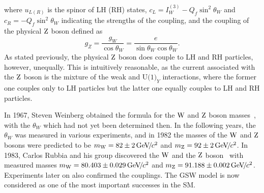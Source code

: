 where $u_{L(R)}$ is the spinor of LH (RH) states, $c_{L}=I_{W}^{(3)}-Q_{f}\sin^{2}\theta_{W}$ and $c_{R}=-Q_{f}\sin^{2}\theta_{W}$ indicating the strengths of the coupling, and the coupling of the physical $\mathrm{Z}$ boson defined as
\begin{equation}
\label{eqn:couplingZ}
g_{Z}=\frac{g_{W}}{\cos\theta_{W}}=\frac{e}{\sin\theta_{W}\cos\theta_{W}}.
\end{equation}
As stated previously, the physical $\mathrm{Z}$ boson does couple to LH and RH particles, however, unequally. This is intuitively reasonable, as the current associated with the $\mathrm{Z}$ boson is the mixture of the weak and $\text{U(1)}_{Y}$ interactions, where the former one couples only to LH particles but the latter one equally couples to LH and RH particles.

In 1967, Steven Weinberg obtained the formula for the $\mathrm{W}$ and $\mathrm{Z}$ boson masses~\cite{PhysRevLett.19.1264}, with the $\theta_{W}$ which had not yet been determined then. In the following years, the $\theta_{W}$ was measured in various experiments, and in 1982 the masses of the $\mathrm{W}$ and $\mathrm{Z}$ bosons were predicted to be $m_{\mathrm{W}}=82\pm 2{\,\text{Ge\hspace{-.08em}V\hspace{-0.16em}/\hspace{-0.08em}}c^\text{2}}$ and $m_{\mathrm{Z}}=92\pm 2 {\,\text{Ge\hspace{-.08em}V\hspace{-0.16em}/\hspace{-0.08em}}c^\text{2}}$. In 1983, Carlos Rubbia and his group discovered the $\mathrm{W}$ and the $\mathrm{Z}$ boson~\cite{ARNISON1983103,ARNISON1984241} with measured masses $m_{\mathrm{W}}=80.403\pm 0.029{\,\text{Ge\hspace{-.08em}V\hspace{-0.16em}/\hspace{-0.08em}}c^\text{2}}$ and $m_{\mathrm{Z}}=91.188\pm 0.002{\,\text{Ge\hspace{-.08em}V\hspace{-0.16em}/\hspace{-0.08em}}c^\text{2}}$. Experiments later on also confirmed the couplings. The GSW model is now considered as one of the most important successes in the SM. 

